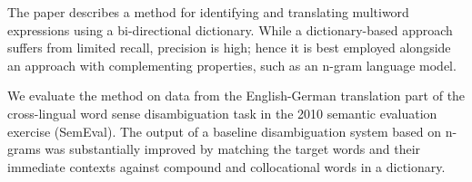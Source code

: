 The paper describes a method for identifying and translating multiword expressions using a bi-directional dictionary. While a dictionary-based
 approach suffers from limited recall, precision is high; hence it is best
 employed alongside an approach with complementing properties, such as an n-gram
 language model.
 
 We evaluate the method on data from the English-German translation part of the
 cross-lingual word sense disambiguation task in the 2010 semantic evaluation
 exercise (SemEval). The output of a baseline disambiguation system based on
 n-grams was substantially improved by matching the target words and their
 immediate contexts against compound and collocational words in a dictionary.


